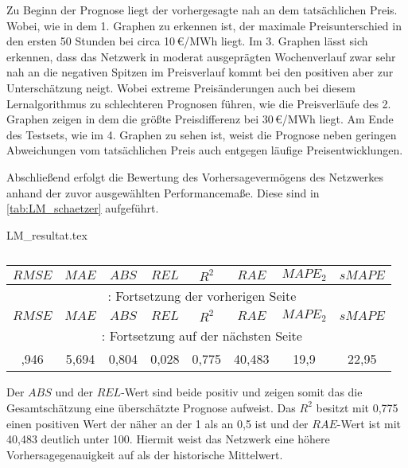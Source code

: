 Zu Beginn der Prognose liegt der vorhergesagte nah an dem tatsächlichen Preis. Wobei, wie in dem 1. Graphen zu erkennen ist, der maximale Preisunterschied in den ersten 50 Stunden bei circa 10\,€/MWh liegt. Im 3. Graphen lässt sich erkennen, dass das Netzwerk in moderat ausgeprägten Wochenverlauf zwar sehr nah an die negativen Spitzen im Preisverlauf kommt bei den positiven aber zur Unterschätzung neigt. Wobei extreme Preisänderungen auch bei diesem Lernalgorithmus zu schlechteren Prognosen führen, wie die Preisverläufe des 2. Graphen zeigen in dem die größte Preisdifferenz bei 30\,€/MWh liegt. Am Ende des Testsets, wie im 4. Graphen zu sehen ist, weist die Prognose neben geringen Abweichungen vom tatsächlichen Preis auch entgegen läufige Preisentwicklungen. 

Abschließend erfolgt die Bewertung des Vorhersagevermögens des Netzwerkes anhand der zuvor ausgewählten Performancemaße. Diese sind in \autoref{tab:LM_schaetzer} aufgeführt.

\begin{filecontents*}{LM_resultat.tex}
{
\captionsetup{skip=1pt,margin=5pt,position=below} %

\begin{longtable}{cccccccc}
    \caption{} \label{tab:LM_schaetzer}\\
    \toprule
    \hiderowcolors
        $RMSE$ & $MAE$ & $ABS$ & $REL$ & $R^2$ & $RAE$ & $MAPE_2$ & $sMAPE$ \\
    \midrule
    \endfirsthead
        \multicolumn{8}{c}{\footnotesize \tablename\ \thetable{}: Fortsetzung der vorherigen Seite} \\
    \toprule
        $RMSE$ & $MAE$ & $ABS$ & $REL$ & $R^2$ & $RAE$ & $MAPE_2$ & $sMAPE$ \\
    \midrule
    \endhead
    \midrule
        \multicolumn{8}{c}{{\footnotesize \tablename\ \thetable{}: Fortsetzung auf der nächsten Seite}} \\
    \bottomrule
    \endfoot
    \bottomrule
    \endlastfoot
    \showrowcolors
        7,946 & 5,694 & 0,804 & 0,028 & 0,775 & 40,483 & 19,9 & 22,95 \\
\end{longtable}

}
\end{filecontents*}

Der $ABS$ und der $REL$-Wert sind beide positiv und zeigen somit das die Gesamtschätzung eine überschätzte Prognose aufweist. Das $R^2$ besitzt mit 0,775 einen positiven Wert der näher an der 1 als an 0,5 ist und der $RAE$-Wert ist mit 40,483 deutlich unter 100. Hiermit weist das Netzwerk eine höhere Vorhersagegenauigkeit auf als der historische Mittelwert. 

